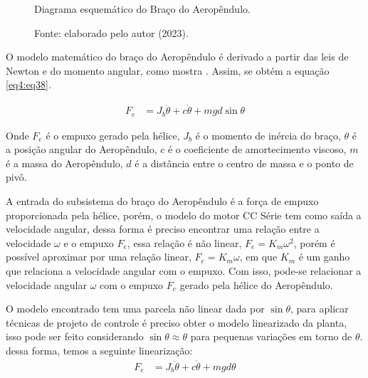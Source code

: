 \begin{figure}[!h]
	\centering
	\caption{Diagrama esquemático do Braço do Aeropêndulo.}
	\caption*{Fonte: elaborado pelo autor (2023).}
        \label{fig4:image_04}
\end{figure}


O modelo matemático do braço do Aeropêndulo é derivado a partir das leis de Newton e do momento angular, como mostra \cite{amin}. Assim, se obtém a equação \ref{eq4:eq38}.

\begin{align}
    F_e &= J_b\ddot{\theta} + c\dot{\theta} +mgd\sin{\theta}  \label{eq4:eq38}
\end{align}


Onde $F_e$ é o empuxo gerado pela hélice, $J_b$  é o momento de inércia do braço, $\theta$  é a posição angular do Aeropêndulo, $c$  é o coeficiente de amortecimento viscoso, $m$ é a massa do Aeropêndulo, $d$  é a distância entre o centro de massa e o ponto de pivô.

A entrada do subsistema do braço do Aeropêndulo é a força de empuxo proporcionada pela hélice, porém, o modelo do motor CC Série tem como saída a velocidade angular, dessa forma é preciso encontrar uma relação entre a velocidade $\omega$ e o empuxo $F_e$, essa relação é não linear, $F_e = K_m\omega^2$, porém é possível aproximar por uma relação linear,  $F_e = K_m\omega$, em que $K_m$ é um ganho que relaciona a velocidade angular com o empuxo. Com isso, pode-se relacionar a velocidade angular $\omega$  com o empuxo $F_e$ gerado pela hélice do Aeropêndulo.

O modelo encontrado tem uma parcela não linear dada por $\sin{\theta}$, para aplicar técnicas de projeto de controle é preciso obter o modelo linearizado da planta, isso pode ser feito considerando $\sin{\theta} \approx \theta$ para pequenas variações em torno de $\theta$. dessa forma, temos a seguinte linearização:
\begin{align}
    F_e &= J_b\ddot{\theta} + c\dot{\theta} +mgd\theta
    \label{eq4:eq39}
\end{align}

